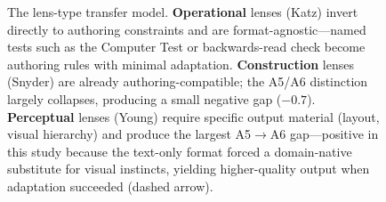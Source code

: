 \begin{figure}[t]
\begin{tikzpicture}
\end{tikzpicture}

\caption{The lens-type transfer model. \textbf{Operational} lenses (Katz) invert
directly to authoring constraints and are format-agnostic---named tests such as the
Computer Test or backwards-read check become authoring rules with minimal adaptation.
\textbf{Construction} lenses (Snyder) are already authoring-compatible; the
A5/A6 distinction largely collapses, producing a small negative gap ($-0.7$).
\textbf{Perceptual} lenses (Young) require specific output material (layout,
visual hierarchy) and produce the largest A5$\to$A6 gap---positive in this study
because the text-only format forced a domain-native substitute for visual instincts,
yielding higher-quality output when adaptation succeeded (dashed arrow).}
\label{fig:lens}
\end{figure}
